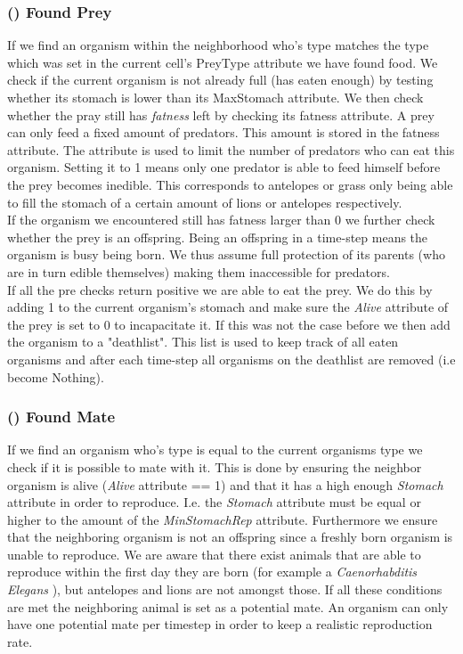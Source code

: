 \documentclass[11pt]{article}
\begin{document}
\subsubsection{() Found Prey}
If we find an organism within the neighborhood who's type matches the type which was set in the current cell's PreyType attribute we have found food. We check if the current organism is not already full (has eaten enough) by testing whether its stomach is lower than its MaxStomach attribute. We then check whether the pray still has {\it fatness} left by checking its fatness attribute. A prey can only feed a fixed amount of predators. This amount is stored in the fatness attribute. The attribute is used to limit the number of predators who can eat this organism. Setting it to 1 means only one predator is able to feed himself before the prey becomes inedible. This corresponds to antelopes or grass only being able to fill the stomach of a certain amount of lions or antelopes respectively.\\
If the organism we encountered still has fatness larger than 0 we further check whether the prey is an offspring. Being an offspring in a time-step means the organism is busy being born. We thus assume full protection of its parents (who are in turn edible themselves) making them inaccessible for predators.\\
If all the pre checks return positive we are able to eat the prey. We do this by adding 1 to the current organism's stomach and make sure the {\it Alive} attribute of the prey is set to 0 to incapacitate it. If this was not the case before we then add the organism to a "deathlist". This list is used to keep track of all eaten organisms and after each time-step all organisms on the deathlist are removed (i.e become Nothing). 

\addtocounter{protocolCounter}{1}
\subsubsection{() Found Mate}
If we find an organism who's type is equal to the current organisms type we check if it is possible to mate with it. This is done by ensuring the neighbor organism is alive ({\it Alive} attribute == 1) and that it has a high enough {\it Stomach} attribute in order to reproduce. I.e. the {\it Stomach} attribute must be equal or higher to the amount of the {\it MinStomachRep} attribute. Furthermore we ensure that the neighboring organism is not an offspring since a freshly born organism is unable to reproduce. We are aware that there exist animals that are able to reproduce within the first day they are born (for example a {\it Caenorhabditis Elegans} \cite{caenorhabditisElegans}), but antelopes and lions are not amongst those. If all these conditions are met the neighboring animal is set as a potential mate. An organism can only have one potential mate per timestep in order to keep a realistic reproduction rate.
\end{document}
